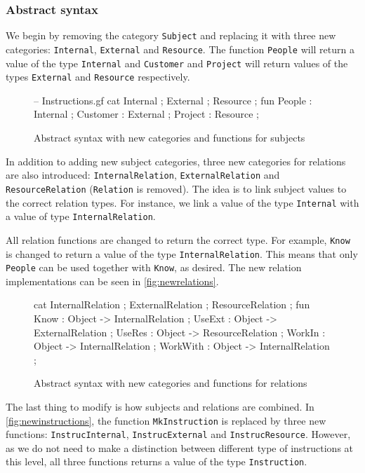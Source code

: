 \subsubsection*{Abstract syntax}
We begin by removing the category \texttt{Subject} and replacing it with three new categories: \texttt{Internal}, \texttt{External} and \texttt{Resource}. The function \texttt{People} will return a value of the type \texttt{Internal} and \texttt{Customer} and \texttt{Project} will return values of the types \texttt{External} and \texttt{Resource} respectively.

\begin{figure}[H]
\begin{code}
-- Instructions.gf
cat
  Internal ;
  External ;
  Resource ;
fun
  People   : Internal ;
  Customer : External ;
  Project  : Resource ;
\end{code}
\caption{Abstract syntax with new categories and functions for subjects}
\end{figure}

In addition to adding new subject categories, three new categories for relations are also introduced: \texttt{InternalRelation}, \texttt{ExternalRelation} and \texttt{ResourceRelation} (\texttt{Relation} is removed). The idea is to link subject values to the correct relation types. For instance, we link a value of the type \texttt{Internal} with a value of type \texttt{InternalRelation}.

All relation functions are changed to return the correct type. For example, \texttt{Know} is changed to return a value of the type \texttt{InternalRelation}. This means that only \texttt{People} can be used together with \texttt{Know}, as desired. The new relation implementations can be seen in \autoref{fig:newrelations}.

\begin{figure}[H]
\begin{code}
cat
  InternalRelation ;
  ExternalRelation ;
  ResourceRelation ;
fun
  Know     : Object -> InternalRelation ;
  UseExt   : Object -> ExternalRelation ;
  UseRes   : Object -> ResourceRelation ;
  WorkIn   : Object -> InternalRelation ;
  WorkWith : Object -> InternalRelation ;
\end{code}
\caption{Abstract syntax with new categories and functions for relations \label{fig:newrelations}}
\end{figure}

The last thing to modify is how subjects and relations are combined. In \autoref{fig:newinstructions}, the function \texttt{MkInstruction} is replaced by three new functions: \texttt{InstrucInternal}, \texttt{InstrucExternal} and \texttt{InstrucResource}. However, as we do not need to make a distinction between different type of instructions at this level, all three functions returns a value of the type \texttt{Instruction}.

